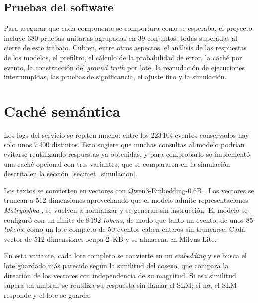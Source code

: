 \subsection{Pruebas del software}\label{sec:met_pruebas}

Para asegurar que cada componente se comportara como se esperaba, el proyecto incluye 380 pruebas unitarias agrupadas en 39 conjuntos, todas superadas al cierre de este trabajo. Cubren, entre otros aspectos, el análisis de las respuestas de los modelos, el prefiltro, el cálculo de la probabilidad de error, la caché por evento, la construcción del \textit{ground truth} por lote, la reanudación de ejecuciones interrumpidas, las pruebas de significancia, el ajuste fino y la simulación.

\section{Caché semántica}\label{sec:met_cache}

Los logs del servicio se repiten mucho: entre los 223\,104 eventos conservados hay solo unos 7\,400 distintos. Esto sugiere que muchas consultas al modelo podrían evitarse reutilizando respuestas ya obtenidas, y para comprobarlo se implementó una caché opcional con tres variantes, que se compararon en la simulación descrita en la sección~\ref{sec:met_simulacion}.


Los textos se convierten en vectores con Qwen3-Embedding-0.6B \cite{zhang2025_qwen3emb}. Los vectores se truncan a 512 dimensiones aprovechando que el modelo admite representaciones \textit{Matryoshka} \cite{kusupati2022_matryoshka}, se vuelven a normalizar y se generan sin instrucción. El modelo se configuró con un límite de 8\,192 \textit{tokens}, de modo que tanto un evento, de unos 85 \textit{tokens}, como un lote completo de 50 eventos caben enteros sin truncarse. Cada vector de 512 dimensiones ocupa 2~KB y se almacena en Milvus Lite.


En esta variante, cada lote completo se convierte en un \textit{embedding} y se busca el lote guardado más parecido según la similitud del coseno, que compara la dirección de los vectores con independencia de su magnitud. Si esa similitud supera un umbral, se reutiliza su respuesta sin llamar al SLM; si no, el SLM responde y el lote se guarda.


